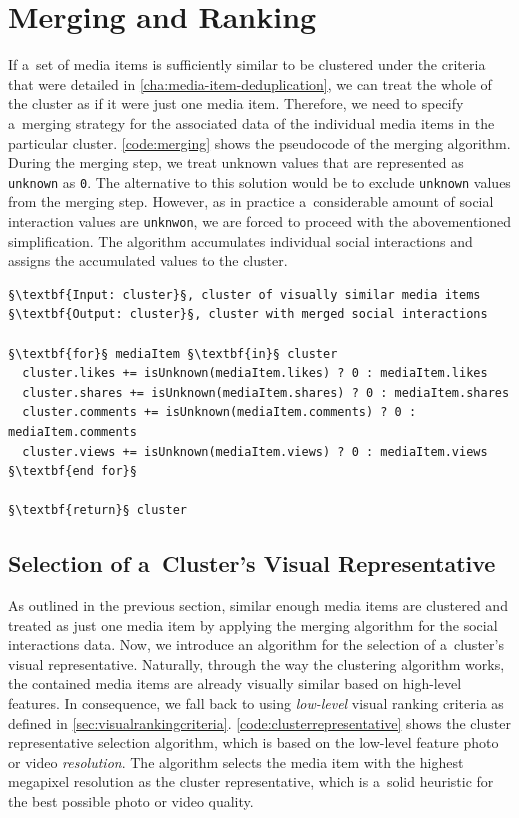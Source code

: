 \section{Merging and Ranking}
\label{sec:merging-social-interactions}

If a~set of media items is sufficiently similar to be clustered
under the criteria that were detailed in
\autoref{cha:media-item-deduplication},
we can treat the whole of the cluster
as if it were just one media item.
Therefore, we need to specify a~merging strategy
for the associated data of the individual media items
in the particular cluster.
\autoref{code:merging} shows the pseudocode of the merging algorithm.
During the merging step, we treat unknown values
that are represented as \texttt{unknown} as \texttt{0}.
The alternative to this solution would be to exclude \texttt{unknown} values
from the merging step.
However, as in practice a~considerable amount of
social interaction values are \texttt{unknwon},
we are forced to proceed with the abovementioned simplification.
The algorithm accumulates individual social interactions
and assigns the accumulated values to the cluster.

\begin{lstlisting}[caption=Social interactions merging algorithm,
  label=code:merging, float=!ht, escapechar=§]
§\textbf{Input: cluster}§, cluster of visually similar media items 
§\textbf{Output: cluster}§, cluster with merged social interactions 

§\textbf{for}§ mediaItem §\textbf{in}§ cluster
  cluster.likes += isUnknown(mediaItem.likes) ? 0 : mediaItem.likes
  cluster.shares += isUnknown(mediaItem.shares) ? 0 : mediaItem.shares
  cluster.comments += isUnknown(mediaItem.comments) ? 0 : mediaItem.comments
  cluster.views += isUnknown(mediaItem.views) ? 0 : mediaItem.views
§\textbf{end for}§

§\textbf{return}§ cluster
\end{lstlisting}

\subsection{Selection of a~Cluster's Visual Representative}  

As outlined in the previous section, similar enough media items
are clustered and treated as just one media item
by applying the merging algorithm for the social interactions data.
Now, we introduce an algorithm for the selection of
a~cluster's visual representative.
Naturally, through the way the clustering algorithm works,
the contained media items are already visually similar
based on high-level features. 
In consequence, we fall back to using \emph{low-level}
visual ranking criteria as defined in \autoref{sec:visualrankingcriteria}.
\autoref{code:clusterrepresentative} shows the cluster representative
selection algorithm, which is based on the low-level feature photo or video \emph{resolution}.
The algorithm selects the media item with the highest megapixel resolution
as the cluster representative,
which is a~solid heuristic for the best possible photo or video quality.

